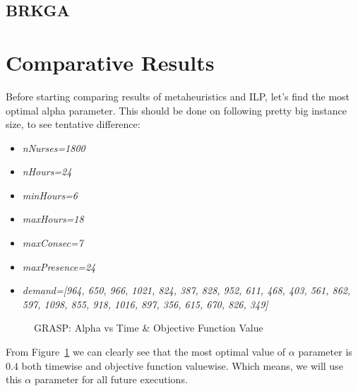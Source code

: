 \documentclass{article}
\newcommand\tab[1][1cm]{\hspace*{#1}}
\begin{document}
	\subsection{BRKGA}
	\section{Comparative Results}
\tab Before starting comparing results of metaheuristics and ILP, let's find the most optimal alpha parameter. This should be done on following pretty big instance size, to see tentative difference:
\begin{itemize}
	\item \small \textit{nNurses=1800}
	\item \small \textit{nHours=24}
	\item \small \textit{minHours=6}
	\item \small \textit{maxHours=18}
	\item \small \textit{maxConsec=7}
	\item \small \textit{maxPresence=24}
	\item \small \textit{demand=[964, 650, 966, 1021, 824, 387, 828, 952, 611, 468, 403, 561, 862, 597, 1098, 855, 918, 1016, 897, 356, 615, 670, 826, 349]}
\end{itemize}

\begin{figure}[!htbp]
	\caption{GRASP: Alpha vs Time \& Objective Function Value}
	\label{fig:graspalpha}
\end{figure}
\tab From Figure~\ref{fig:graspalpha} we can clearly see that the most optimal value of $\alpha$ parameter is $0.4$ both timewise and objective function valuewise. Which means, we will use this $\alpha$ parameter for all future executions. 
\end{document}
